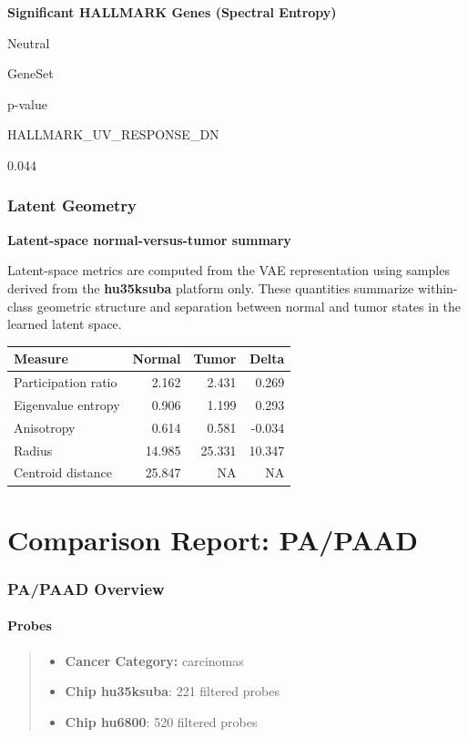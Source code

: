 \documentclass[
  letterpaper,
  DIV=11,
  numbers=noendperiod,
  openany,
  oneside]{scrreprt}
\providecommand{\tightlist}{%
  \setlength{\itemsep}{0pt}\setlength{\parskip}{0pt}}
\begin{document}
\textbf{Significant HALLMARK Genes (Spectral Entropy)}

Neutral

GeneSet

p-value

HALLMARK\_UV\_RESPONSE\_DN

0.044

\subsection{Latent Geometry}

\textbf{Latent-space normal-versus-tumor summary}

Latent-space metrics are computed from the VAE representation using
samples derived from the \textbf{hu35ksuba} platform only. These
quantities summarize within-class geometric structure and separation
between normal and tumor states in the learned latent space.

\begin{longtable}[]{@{}lrrr@{}}
\toprule\noalign{}
Measure & Normal & Tumor & Delta \\
\midrule\noalign{}
\endhead
\bottomrule\noalign{}
\endlastfoot
Participation ratio & 2.162 & 2.431 & 0.269 \\
Eigenvalue entropy & 0.906 & 1.199 & 0.293 \\
Anisotropy & 0.614 & 0.581 & -0.034 \\
Radius & 14.985 & 25.331 & 10.347 \\
Centroid distance & 25.847 & NA & NA \\
\end{longtable}

\chapter{Comparison Report: PA/PAAD}\label{comparison-report-papaad}

\subsection{PA/PAAD Overview}

\subsubsection{Probes}

\begin{quote}
\begin{itemize}
\tightlist
\item
  \textbf{Cancer Category:} carcinomas
\item
  \textbf{Chip hu35ksuba}: 221 filtered probes
\item
  \textbf{Chip hu6800}: 520 filtered probes
\end{itemize}
\end{quote}
\end{document}
